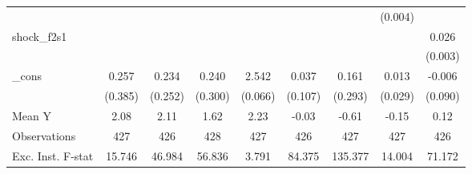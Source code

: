 {\begin{tabular}{l*{8}{c}}
            &                     &                     &                     &                     &                     &                     &     (0.004)         &                     \\
\addlinespace
shock\_f2s1  &                     &                     &                     &                     &                     &                     &                     &       0.026\sym{***}\\
            &                     &                     &                     &                     &                     &                     &                     &     (0.003)         \\
\addlinespace
\_cons      &       0.257         &       0.234         &       0.240         &       2.542\sym{***}&       0.037         &       0.161         &       0.013         &      -0.006         \\
            &     (0.385)         &     (0.252)         &     (0.300)         &     (0.066)         &     (0.107)         &     (0.293)         &     (0.029)         &     (0.090)         \\
\midrule
Mean Y      &        2.08         &        2.11         &        1.62         &        2.23         &       -0.03         &       -0.61         &       -0.15         &        0.12         \\
Observations&         427         &         426         &         428         &         427         &         426         &         427         &         427         &         426         \\
Exc. Inst. F-stat&      15.746         &      46.984         &      56.836         &       3.791         &      84.375         &     135.377         &      14.004         &      71.172         \\
\bottomrule
\end{tabular}
}
